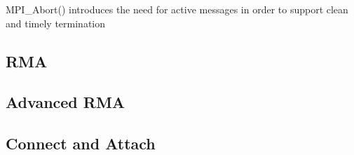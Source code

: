 MPI_Abort() introduces the need for active messages in order to support clean
and timely termination


\subsection{RMA}


\subsection{Advanced RMA}


\subsection{Connect and Attach}

